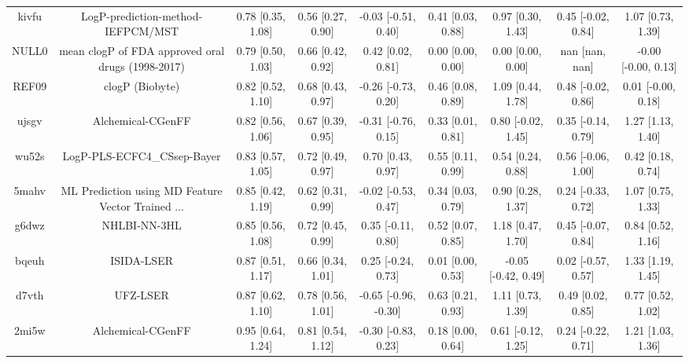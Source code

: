 \documentclass{article}
\begin{document}
\begin{center}
\begin{longtable}{|ccccccccc|}
 kivfu &                  LogP-prediction-method-IEFPCM/MST &  0.78 [0.35, 1.08] &  0.56 [0.27, 0.90] &   -0.03 [-0.51, 0.40] &  0.41 [0.03, 0.88] &    0.97 [0.30, 1.43] &   0.45 [-0.02, 0.84] &     1.07 [0.73, 1.39] \\
 NULL0 &  mean clogP of FDA approved oral drugs (1998-2017) &  0.79 [0.50, 1.03] &  0.66 [0.42, 0.92] &     0.42 [0.02, 0.81] &  0.00 [0.00, 0.00] &    0.00 [0.00, 0.00] &       nan [nan, nan] &   -0.00 [-0.00, 0.13] \\
 REF09 &                                    clogP (Biobyte) &  0.82 [0.52, 1.10] &  0.68 [0.43, 0.97] &   -0.26 [-0.73, 0.20] &  0.46 [0.08, 0.89] &    1.09 [0.44, 1.78] &   0.48 [-0.02, 0.86] &    0.01 [-0.00, 0.18] \\
 ujsgv &                                  Alchemical-CGenFF &  0.82 [0.56, 1.06] &  0.67 [0.39, 0.95] &   -0.31 [-0.76, 0.15] &  0.33 [0.01, 0.81] &   0.80 [-0.02, 1.45] &   0.35 [-0.14, 0.79] &     1.27 [1.13, 1.40] \\
 wu52s &                        LogP-PLS-ECFC4\_CSsep-Bayer &  0.83 [0.57, 1.05] &  0.72 [0.49, 0.97] &     0.70 [0.43, 0.97] &  0.55 [0.11, 0.99] &    0.54 [0.24, 0.88] &   0.56 [-0.06, 1.00] &     0.42 [0.18, 0.74] \\
 5mahv &  ML Prediction using MD Feature Vector Trained ... &  0.85 [0.42, 1.19] &  0.62 [0.31, 0.99] &   -0.02 [-0.53, 0.47] &  0.34 [0.03, 0.79] &    0.90 [0.28, 1.37] &   0.24 [-0.33, 0.72] &     1.07 [0.75, 1.33] \\
 g6dwz &                                       NHLBI-NN-3HL &  0.85 [0.56, 1.08] &  0.72 [0.45, 0.99] &    0.35 [-0.11, 0.80] &  0.52 [0.07, 0.85] &    1.18 [0.47, 1.70] &   0.45 [-0.07, 0.84] &     0.84 [0.52, 1.16] \\
 bqeuh &                                         ISIDA-LSER &  0.87 [0.51, 1.17] &  0.66 [0.34, 1.01] &    0.25 [-0.24, 0.73] &  0.01 [0.00, 0.53] &  -0.05 [-0.42, 0.49] &   0.02 [-0.57, 0.57] &     1.33 [1.19, 1.45] \\
 d7vth &                                           UFZ-LSER &  0.87 [0.62, 1.10] &  0.78 [0.56, 1.01] &  -0.65 [-0.96, -0.30] &  0.63 [0.21, 0.93] &    1.11 [0.73, 1.39] &    0.49 [0.02, 0.85] &     0.77 [0.52, 1.02] \\
 2mi5w &                                  Alchemical-CGenFF &  0.95 [0.64, 1.24] &  0.81 [0.54, 1.12] &   -0.30 [-0.83, 0.23] &  0.18 [0.00, 0.64] &   0.61 [-0.12, 1.25] &   0.24 [-0.22, 0.71] &     1.21 [1.03, 1.36] \\

\end{longtable}
\end{center}
\end{document}
